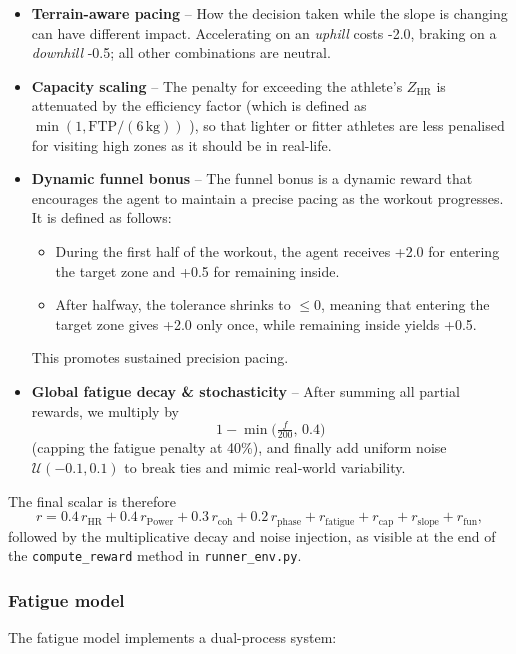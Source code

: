 \begin{itemize}
  \item \textbf{Terrain-aware pacing} – How the decision taken while the slope is changing can have different impact. Accelerating on an
        \emph{uphill} costs -2.0, braking on a \emph{downhill} -0.5; all other combinations are neutral.

  \item \textbf{Capacity scaling} –  The penalty for exceeding the athlete's \(Z_{\text{HR}}\) is attenuated by the efficiency factor (which is defined as \(\min(1,\text{FTP}/(6\,\text{kg}))\) ), so that lighter or fitter athletes are less penalised for visiting high zones as it should be in real-life.
  
  \item \textbf{Dynamic funnel bonus} – The funnel bonus is a dynamic reward that encourages the agent to maintain a precise pacing as the workout progresses.  It is defined as follows:
        \begin{itemize}
          \item During the first half of the workout, the agent receives +2.0 for entering the target zone and +0.5 for remaining inside.
          \item After halfway, the tolerance shrinks to \(\le 0\), meaning that entering the target zone gives +2.0 only once, while remaining inside yields +0.5.
        \end{itemize}
        This promotes sustained precision pacing.

    \item \textbf{Global fatigue decay \& stochasticity} – After summing all partial rewards, we multiply by 
    \[
      1-\min\!\bigl(\tfrac{f}{200},\,0.4\bigr)\,
    \]
    (capping the fatigue penalty at 40\%), and finally add uniform noise \(\mathcal{U}(-0.1,0.1)\) to break ties and mimic real‐world variability.

\end{itemize}

The final scalar is therefore
\[
r = 0.4\,r_{\text{HR}} + 0.4\,r_{\text{Power}}
     + 0.3\,r_{\mathrm{coh}} + 0.2\,r_{\mathrm{phase}}
     + r_{\mathrm{fatigue}} + r_{\mathrm{cap}}
     + r_{\mathrm{slope}} + r_{\mathrm{fun}},
\]
followed by the multiplicative decay and noise injection, as visible at the end of the \texttt{compute\_reward} method in \texttt{runner\_env.py}.


\subsubsection{Fatigue model}\label{subsubsec:fatigue}
The fatigue model implements a dual-process system: 

